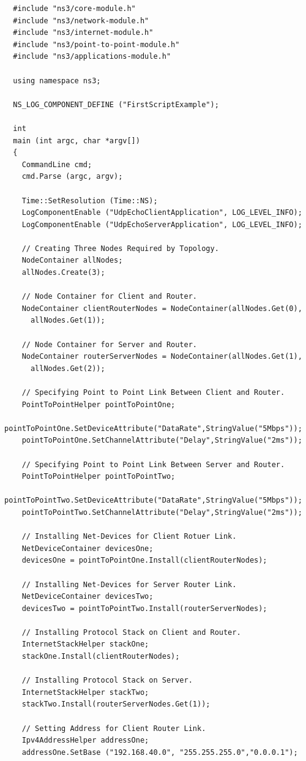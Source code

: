 \documentclass[fullpage]{article}
\begin{document}
\begin{verbatim}
  #include "ns3/core-module.h"
  #include "ns3/network-module.h"
  #include "ns3/internet-module.h"
  #include "ns3/point-to-point-module.h"
  #include "ns3/applications-module.h"

  using namespace ns3;

  NS_LOG_COMPONENT_DEFINE ("FirstScriptExample");

  int
  main (int argc, char *argv[])
  {
    CommandLine cmd;
    cmd.Parse (argc, argv);

    Time::SetResolution (Time::NS);
    LogComponentEnable ("UdpEchoClientApplication", LOG_LEVEL_INFO);
    LogComponentEnable ("UdpEchoServerApplication", LOG_LEVEL_INFO);

    // Creating Three Nodes Required by Topology.
    NodeContainer allNodes;
    allNodes.Create(3);

    // Node Container for Client and Router.
    NodeContainer clientRouterNodes = NodeContainer(allNodes.Get(0),
      allNodes.Get(1));

    // Node Container for Server and Router.
    NodeContainer routerServerNodes = NodeContainer(allNodes.Get(1),
      allNodes.Get(2));

    // Specifying Point to Point Link Between Client and Router.
    PointToPointHelper pointToPointOne;
    pointToPointOne.SetDeviceAttribute("DataRate",StringValue("5Mbps"));
    pointToPointOne.SetChannelAttribute("Delay",StringValue("2ms"));

    // Specifying Point to Point Link Between Server and Router.
    PointToPointHelper pointToPointTwo;
    pointToPointTwo.SetDeviceAttribute("DataRate",StringValue("5Mbps"));
    pointToPointTwo.SetChannelAttribute("Delay",StringValue("2ms"));

    // Installing Net-Devices for Client Rotuer Link.
    NetDeviceContainer devicesOne;
    devicesOne = pointToPointOne.Install(clientRouterNodes);

    // Installing Net-Devices for Server Router Link.
    NetDeviceContainer devicesTwo;
    devicesTwo = pointToPointTwo.Install(routerServerNodes);

    // Installing Protocol Stack on Client and Router.
    InternetStackHelper stackOne;
    stackOne.Install(clientRouterNodes);

    // Installing Protocol Stack on Server.
    InternetStackHelper stackTwo;
    stackTwo.Install(routerServerNodes.Get(1));

    // Setting Address for Client Router Link.
    Ipv4AddressHelper addressOne;
    addressOne.SetBase ("192.168.40.0", "255.255.255.0","0.0.0.1");


\end{verbatim}
\end{document}
